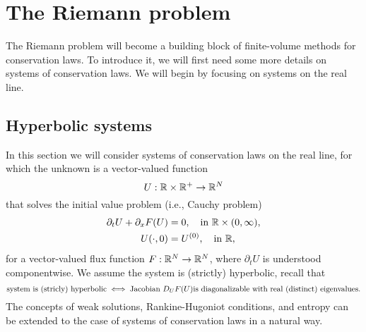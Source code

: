 \section{The Riemann problem}

The Riemann problem will become a building block of finite-volume methods for conservation laws.
To introduce it, we will first need some more details on systems of conservation laws.
We will begin by focusing on systems on the real line.


\subsection{Hyperbolic systems}

In this section we will consider systems of conservation laws on the real line, for which the unknown is a vector-valued function
\[
	U: \mathbb{R} \times \mathbb{R}^+ \to \mathbb{R}^N
\]
that solves the initial value problem (i.e., Cauchy problem)
\begin{align*}
	\partial_t U + \partial_x F\parentheses*{U} &= 0, \quad \text{in }\R \times \parentheses*{0, \infty},\\
	U\parentheses*{\cdot, 0} &= U^{\parentheses*{0}}, \quad \text{in }\R,
\end{align*}
for a vector-valued flux function \(F: \mathbb{R}^N \to \mathbb{R}^N\), where \(\partial_t U\) is understood componentwise.
We assume the system is (strictly) hyperbolic, recall that
\[
	\text{system is (stricly) hyperbolic} \iff \text{Jacobian }D_U F\parentheses*{U}\text{is diagonalizable with real (distinct) eigenvalues.}
\]
The concepts of weak solutions, Rankine-Hugoniot conditions, and entropy can be extended to the case of systems of conservation laws in a natural way.

